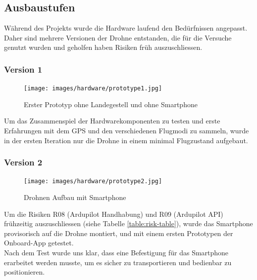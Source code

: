 \subsection{Ausbaustufen}

Während des Projekts wurde die Hardware laufend den Bedürfnissen angepasst. Daher sind mehrere Versionen der Drohne entstanden, die für die Versuche genutzt wurden und geholfen haben Risiken früh auszuschliessen.

\subsubsection{Version 1}

\begin{figure}[H]
	\centering
	\texttt{[image: images/hardware/prototype1.jpg]}
	\caption{Erster Prototyp ohne Landegestell und ohne Smartphone}
	\label{fig:prototyp-1}
\end{figure}

Um das Zusammenspiel der Hardwarekomponenten zu testen und erste Erfahrungen mit dem GPS und den verschiedenen Flugmodi zu sammeln, wurde in der ersten Iteration nur die Drohne in einem minimal Flugzustand aufgebaut.

\subsubsection{Version 2}

\begin{figure}[H]
	\centering
	\texttt{[image: images/hardware/prototype2.jpg]}
	\caption{Drohnen Aufbau mit Smartphone}
	\label{fig:prototyp-2}
\end{figure}

Um die Risiken R08 (Ardupilot Handhabung) und R09 (Ardupilot API) frühzeitig auszuschliessen (siehe Tabelle \ref{table:risk-table}), wurde das Smartphone provisorisch auf die Drohne montiert, und mit einem ersten Prototypen der Onboard-App getestet. \\
Nach dem Test wurde uns klar, dass eine Befestigung für das Smartphone erarbeitet werden musste, um es sicher zu transportieren und bedienbar zu positionieren.

